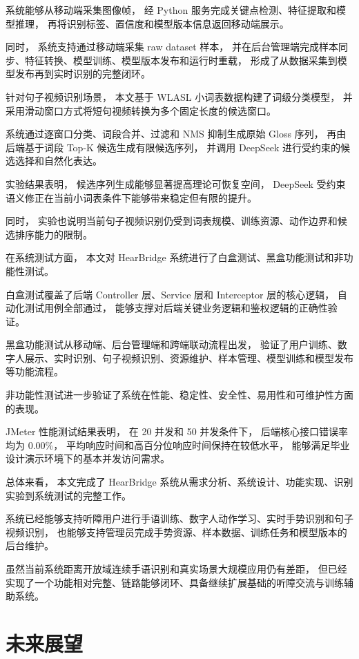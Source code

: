 系统能够从移动端采集图像帧，
经 Python 服务完成关键点检测、特征提取和模型推理，
再将识别标签、置信度和模型版本信息返回移动端展示。

同时，
系统支持通过移动端采集 raw dataset 样本，
并在后台管理端完成样本同步、特征转换、模型训练、模型版本发布和运行时重载，
形成了从数据采集到模型发布再到实时识别的完整闭环。

针对句子视频识别场景，
本文基于 WLASL 小词表数据构建了词级分类模型，
并采用滑动窗口方式将短句视频转换为多个固定长度的候选窗口。

系统通过逐窗口分类、词段合并、过滤和 NMS 抑制生成原始 Gloss 序列，
再由后端基于词段 Top-K 候选生成有限候选序列，
并调用 DeepSeek 进行受约束的候选选择和自然化表达。

实验结果表明，
候选序列生成能够显著提高理论可恢复空间，
DeepSeek 受约束语义修正在当前小词表条件下能够带来稳定但有限的提升。

同时，
实验也说明当前句子视频识别仍受到词表规模、训练资源、动作边界和候选排序能力的限制。

在系统测试方面，
本文对 HearBridge 系统进行了白盒测试、黑盒功能测试和非功能性测试。

白盒测试覆盖了后端 Controller 层、Service 层和 Interceptor 层的核心逻辑，
自动化测试用例全部通过，
能够支撑对后端关键业务逻辑和鉴权逻辑的正确性验证。

黑盒功能测试从移动端、后台管理端和跨端联动流程出发，
验证了用户训练、数字人展示、实时识别、句子视频识别、资源维护、样本管理、模型训练和模型发布等功能流程。

非功能性测试进一步验证了系统在性能、稳定性、安全性、易用性和可维护性方面的表现。

JMeter 性能测试结果表明，
在 20 并发和 50 并发条件下，
后端核心接口错误率均为 0.00\%，
平均响应时间和高百分位响应时间保持在较低水平，
能够满足毕业设计演示环境下的基本并发访问需求。

总体来看，
本文完成了 HearBridge 系统从需求分析、系统设计、功能实现、识别实验到系统测试的完整工作。

系统已经能够支持听障用户进行手语训练、数字人动作学习、实时手势识别和句子视频识别，
也能够支持管理员完成手势资源、样本数据、训练任务和模型版本的后台维护。

虽然当前系统距离开放域连续手语识别和真实场景大规模应用仍有差距，
但已经实现了一个功能相对完整、链路能够闭环、具备继续扩展基础的听障交流与训练辅助系统。

\section{未来展望}

